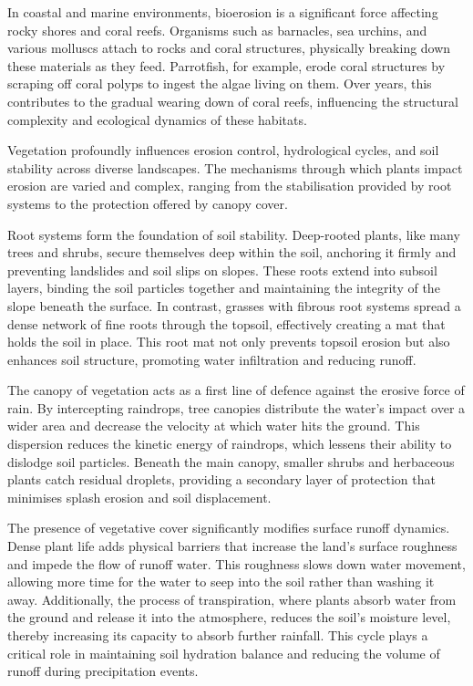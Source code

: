 In coastal and marine environments, bioerosion is a significant force affecting rocky shores and coral reefs. Organisms such as barnacles, sea urchins, and various molluscs attach to rocks and coral structures, physically breaking down these materials as they feed. Parrotfish, for example, erode coral structures by scraping off coral polyps to ingest the algae living on them. Over years, this contributes to the gradual wearing down of coral reefs, influencing the structural complexity and ecological dynamics of these habitats.

Vegetation profoundly influences erosion control, hydrological cycles, and soil stability across diverse landscapes. The mechanisms through which plants impact erosion are varied and complex, ranging from the stabilisation provided by root systems to the protection offered by canopy cover.

Root systems form the foundation of soil stability. Deep-rooted plants, like many trees and shrubs, secure themselves deep within the soil, anchoring it firmly and preventing landslides and soil slips on slopes. These roots extend into subsoil layers, binding the soil particles together and maintaining the integrity of the slope beneath the surface. In contrast, grasses with fibrous root systems spread a dense network of fine roots through the topsoil, effectively creating a mat that holds the soil in place. This root mat not only prevents topsoil erosion but also enhances soil structure, promoting water infiltration and reducing runoff.

The canopy of vegetation acts as a first line of defence against the erosive force of rain. By intercepting raindrops, tree canopies distribute the water's impact over a wider area and decrease the velocity at which water hits the ground. This dispersion reduces the kinetic energy of raindrops, which lessens their ability to dislodge soil particles. Beneath the main canopy, smaller shrubs and herbaceous plants catch residual droplets, providing a secondary layer of protection that minimises splash erosion and soil displacement.

The presence of vegetative cover significantly modifies surface runoff dynamics. Dense plant life adds physical barriers that increase the land's surface roughness and impede the flow of runoff water. This roughness slows down water movement, allowing more time for the water to seep into the soil rather than washing it away. Additionally, the process of transpiration, where plants absorb water from the ground and release it into the atmosphere, reduces the soil's moisture level, thereby increasing its capacity to absorb further rainfall. This cycle plays a critical role in maintaining soil hydration balance and reducing the volume of runoff during precipitation events.

